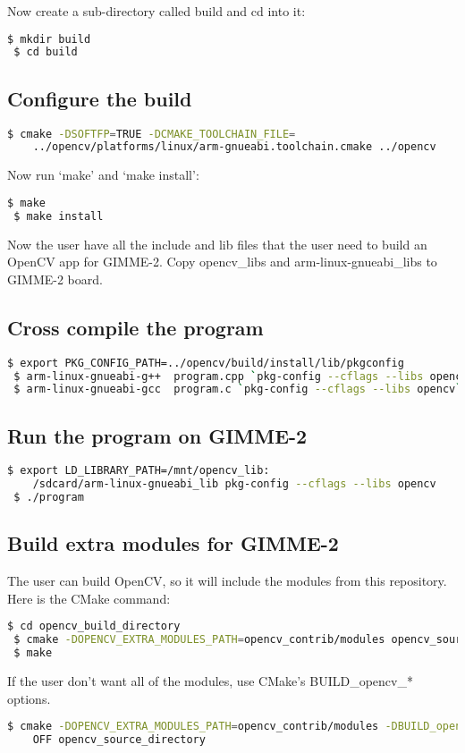 Now create a sub-directory called build and cd into it:
\begin{lstlisting}[language=bash]
 $ mkdir build  
 $ cd build 
\end{lstlisting}
\subsection{Configure the build}
\begin{lstlisting}[language=bash]
 $ cmake -DSOFTFP=TRUE -DCMAKE_TOOLCHAIN_FILE=
    ../opencv/platforms/linux/arm-gnueabi.toolchain.cmake ../opencv 
\end{lstlisting}
Now run ‘make’ and ‘make install’:
\begin{lstlisting}[language=bash]
 $ make 
 $ make install
\end{lstlisting}
Now the user have all the include and lib files that the user need to build an OpenCV app for GIMME-2. Copy opencv\_libs and arm-linux-gnueabi\_libs to GIMME-2 board.

\subsection{Cross compile the program} 
\begin{lstlisting}[language=bash]
 $ export PKG_CONFIG_PATH=../opencv/build/install/lib/pkgconfig  
 $ arm-linux-gnueabi-g++  program.cpp `pkg-config --cflags --libs opencv`   
 $ arm-linux-gnueabi-gcc  program.c `pkg-config --cflags --libs opencv` 
\end{lstlisting}
\subsection{Run the program on GIMME-2}
\begin{lstlisting}[language=bash]
 $ export LD_LIBRARY_PATH=/mnt/opencv_lib:
    /sdcard/arm-linux-gnueabi_lib pkg-config --cflags --libs opencv 
 $ ./program
\end{lstlisting}
\subsection{Build extra modules for GIMME-2}

The user can build OpenCV, so it will include the modules from this repository. Here is the CMake command:
\begin{lstlisting}[language=bash]
 $ cd opencv_build_directory 
 $ cmake -DOPENCV_EXTRA_MODULES_PATH=opencv_contrib/modules opencv_source_directory 
 $ make  
\end{lstlisting}
If the user don't want all of the modules, use CMake's BUILD\_opencv\_* options. 
\begin{lstlisting}[language=bash]
 $ cmake -DOPENCV_EXTRA_MODULES_PATH=opencv_contrib/modules -DBUILD_opencv_legacy=
    OFF opencv_source_directory
\end{lstlisting}